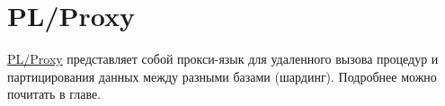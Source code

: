 \section{PL/Proxy}

\href{http://pgfoundry.org/projects/plproxy/}{PL/Proxy} представляет собой прокси-язык для удаленного вызова процедур и партицирования данных между разными базами (шардинг). Подробнее можно почитать в  главе.